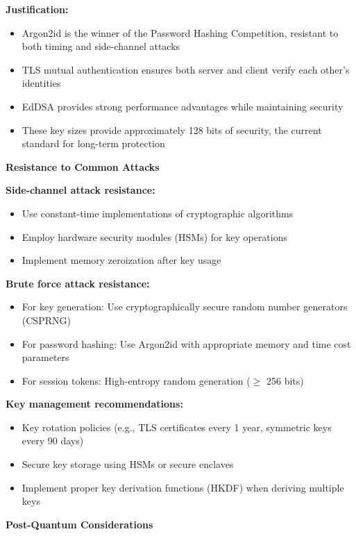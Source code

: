\documentclass{article}
\begin{document}
\begin{enumerate}[label=\textbf{Task \arabic*:}]
\begin{tcolorbox}
		\noindent\textbf{Justification:}
		\begin{itemize}
			\item Argon2id is the winner of the Password Hashing Competition, resistant to both timing and side-channel attacks
			\item TLS mutual authentication ensures both server and client verify each other's identities
			\item EdDSA provides strong performance advantages while maintaining security
			\item These key sizes provide approximately 128 bits of security, the current standard for long-term protection
		\end{itemize}
		
		\bigskip
		\noindent\textbf{\large Resistance to Common Attacks}
		
		\noindent\textbf{Side-channel attack resistance:}
		\begin{itemize}
			\item Use constant-time implementations of cryptographic algorithms
			\item Employ hardware security modules (HSMs) for key operations
			\item Implement memory zeroization after key usage
		\end{itemize}
		
		\noindent\textbf{Brute force attack resistance:}
		\begin{itemize}
			\item For key generation: Use cryptographically secure random number generators (CSPRNG)
			\item For password hashing: Use Argon2id with appropriate memory and time cost parameters
			\item For session tokens: High-entropy random generation ($\geq$ 256 bits)
		\end{itemize}
		
		\noindent\textbf{Key management recommendations:}
		\begin{itemize}
			\item Key rotation policies (e.g., TLS certificates every 1 year, symmetric keys every 90 days)
			\item Secure key storage using HSMs or secure enclaves
			\item Implement proper key derivation functions (HKDF) when deriving multiple keys
		\end{itemize}
		
		\bigskip
		\noindent\textbf{\large Post-Quantum Considerations}
		

\end{tcolorbox}
\end{enumerate}
\end{document}
